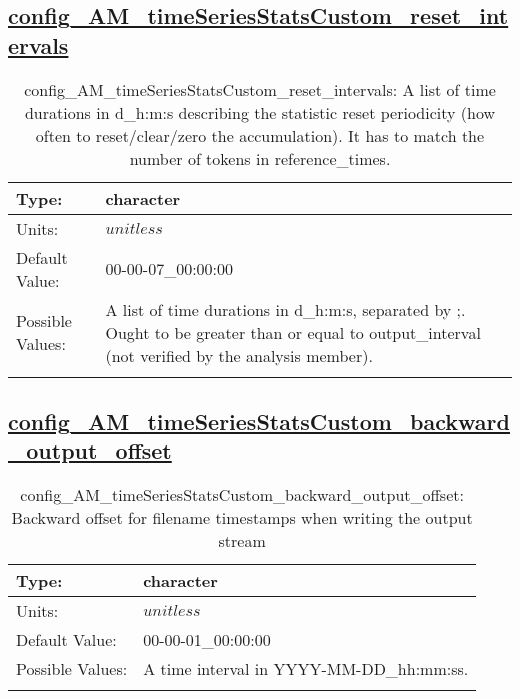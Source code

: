 \subsection[config\_AM\_timeSeriesStatsCustom\_reset\_intervals]{\hyperref[sec:nm_tab_AM_timeSeriesStatsCustom]{config\_AM\_timeSeriesStatsCustom\_reset\_intervals}}
\label{subsec:nm_sec_config_AM_timeSeriesStatsCustom_reset_intervals}
\begin{center}
\begin{longtable}{| p{2.0in} || p{4.0in} |}
    \hline
    Type: & character \\
    \hline
    Units: & $unitless$ \\
    \hline
    Default Value: & 00-00-07\_00:00:00 \\
    \hline
    Possible Values: & A list of time durations in d\_h:m:s, separated by ;. Ought to be greater than or equal to output\_interval (not verified by the analysis member). \\
    \hline
    \caption{config\_AM\_timeSeriesStatsCustom\_reset\_intervals: A list of time durations in d\_h:m:s describing the statistic reset periodicity (how often to reset/clear/zero the accumulation). It has to match the number of tokens in reference\_times.}
\end{longtable}
\end{center}
\subsection[config\_AM\_timeSeriesStatsCustom\_backward\_output\_offset]{\hyperref[sec:nm_tab_AM_timeSeriesStatsCustom]{config\_AM\_timeSeriesStatsCustom\_backward\_output\_offset}}
\label{subsec:nm_sec_config_AM_timeSeriesStatsCustom_backward_output_offset}
\begin{center}
\begin{longtable}{| p{2.0in} || p{4.0in} |}
    \hline
    Type: & character \\
    \hline
    Units: & $unitless$ \\
    \hline
    Default Value: & 00-00-01\_00:00:00 \\
    \hline
    Possible Values: & A time interval in YYYY-MM-DD\_hh:mm:ss. \\
    \hline
    \caption{config\_AM\_timeSeriesStatsCustom\_backward\_output\_offset: Backward offset for filename timestamps when writing the output stream}
\end{longtable}
\end{center}
